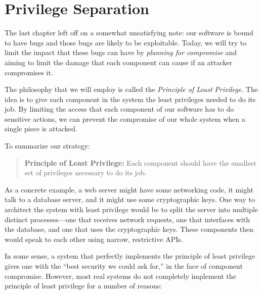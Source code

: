 \chapter{Privilege Separation}

The last chapter left off on a somewhat
unsatisfying note: our software is bound to have
bugs and those bugs are likely to be exploitable.
Today, we will try to limit the impact that these
bugs can have by \emph{planning for compromise}
and aiming to limit the damage that each component
can cause if an attacker compromises it.

The philosophy that we will employ is called the \emph{Principle of Least Privilege}. 
The idea is to give each component in the system the least privileges needed to do 
its job.
By limiting the access that each component of our software has to do sensitive actions, we can prevent the compromise of our whole system when a single piece is attacked.

To summarize our strategy:
\begin{quote}
  \textbf{Principle of Least Privilege:}
	Each component should have the smallest set of privileges necessary to do its job.	
\end{quote}


As a concrete example, a web server might have some networking code, it might
talk to a database server, and it might use some cryptographic keys.
One way to architect the system with least privilege would be to split the
server into multiple distinct processes---one that receives network requests,
one that interfaces with the database, and one that uses the cryptographic keys.
These components then would speak to each other using narrow, restrictive APIs.

In some sense, a system that perfectly implements the principle of least privilege 
gives one with the ``best security we could ask for,'' in the face of component compromise.
However, most real systems do not completely implement the principle of least privilege
for a number of reasons:

